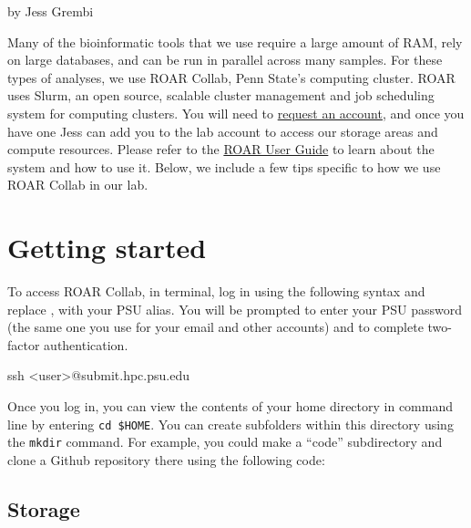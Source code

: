 \documentclass[
]{book}
\newenvironment{Shaded}{\begin{snugshade}}{\end{snugshade}}
\newcommand{\NormalTok}[1]{#1}
\begin{document}
by Jess Grembi

Many of the bioinformatic tools that we use require a large amount of RAM, rely on large databases, and can be run in parallel across many samples. For these types of analyses, we use ROAR Collab, Penn State's computing cluster. ROAR uses Slurm, an open source, scalable cluster management and job scheduling system for computing clusters. You will need to \href{https://www.icds.psu.edu/account-setup/}{request an account}, and once you have one Jess can add you to the lab account to access our storage areas and compute resources. Please refer to the \href{https://docs.icds.psu.edu}{ROAR User Guide} to learn about the system and how to use it. Below, we include a few tips specific to how we use ROAR Collab in our lab.

\section{Getting started}\label{getting-started}

To access ROAR Collab, in terminal, log in using the following syntax and replace , with your PSU alias. You will be prompted to enter your PSU password (the same one you use for your email and other accounts) and to complete two-factor authentication.

\begin{Shaded}
\begin{Highlighting}[]
\NormalTok{ssh \textless{}user\textgreater{}@submit.hpc.psu.edu}
\end{Highlighting}
\end{Shaded}

Once you log in, you can view the contents of your home directory in command line by entering \texttt{cd\ \$HOME}. You can create subfolders within this directory using the \texttt{mkdir} command. For example, you could make a ``code'' subdirectory and clone a Github repository there using the following code:

\begin{Shaded}
\end{Shaded}

\subsection{Storage}\label{storage}
\end{document}
